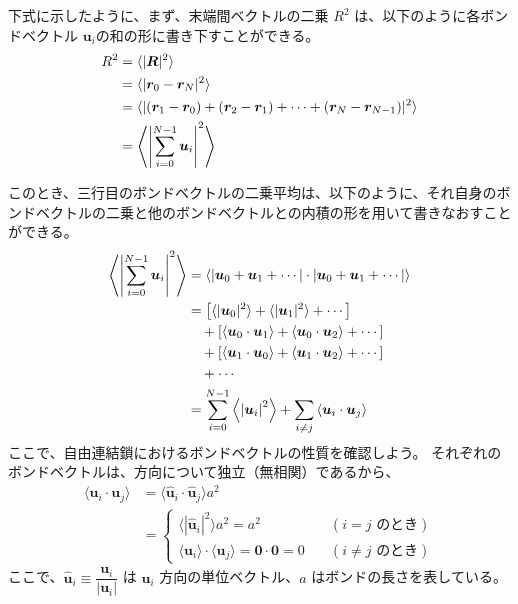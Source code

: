 \documentclass[uplatex,dvipdfmx,a4paper,11pt, titlepage]{jsarticle}
\begin{document}
\begin{itemize}
\begin{enumerate}
	下式に示したように、まず、末端間ベクトルの二乗 $R^2$ は、以下のように各ボンドベクトル ${\bm u_i}$の和の形に書き下すことができる。
	\begin{align*}
	R^2
	&= \langle |\bm{R}|^2 \rangle \notag \\
	&=\langle |\bm{r}_0 - \bm{r}_N|^2 \rangle \notag \\
	&=\langle |(\bm{r}_1 - \bm{r}_0) + (\bm{r}_2 - \bm{r}_1) + \cdots + (\bm{r}_N - \bm{r}_{N-1})|^2 \rangle \notag \\
	&=\left\langle \left|\sum_{i=0}^{N-1}\bm{u}_i \right|^2 \right\rangle
	\end{align*}

	このとき、三行目のボンドベクトルの二乗平均は、以下のように、それ自身のボンドベクトルの二乗と他のボンドベクトルとの内積の形を用いて書きなおすことができる。
	\begin{align*}
	\left\langle \left|\sum_{i=0}^{N-1}\bm{u}_i \right|^2 \right\rangle
		&= \left\langle \left|\bm{u}_0 + \bm{u}_1 + \cdots \right| \cdot \left|\bm{u}_0 + \bm{u}_1 + \cdots \right| \right\rangle \notag \\
		&= \left[ \langle |\bm{u}_0|^2 \rangle + \langle|\bm{u}_1 |^2\rangle + \cdots \right] \notag \\
		&\quad +\left[ \langle \bm{u}_0 \cdot\bm{u}_1 \rangle + \langle \bm{u}_0 \cdot\bm{u}_2 \rangle + \cdots \right] \notag \\
		&\quad +\left[ \langle \bm{u}_1 \cdot\bm{u}_0 \rangle + \langle \bm{u}_1 \cdot\bm{u}_2 \rangle + \cdots \right] \notag \\
		&\quad + \cdots \notag \\
		&=\sum_{i=0}^{N-1} \left\langle \left|\bm{u}_i \right|^2 \right\rangle 
		+\sum_{i \neq j} \left\langle \bm{u}_i \cdot \bm{u}_j \right\rangle
	\end{align*}
	ここで、自由連結鎖におけるボンドベクトルの性質を確認しよう。
	それぞれのボンドベクトルは、方向について独立（無相関）であるから、
	\begin{align*}
	\langle \bm{u}_i \cdot \bm{u}_j \rangle 
	&= \langle \bm{\hat{u}}_i \cdot \bm{\hat{u}}_j \rangle a^2 \\
	&=
		\begin{cases}
		\langle |\bm{\hat{u}}_i |^2 \rangle a^2 = a^2	&\quad (\text{$i = j$ のとき}) \\
		\langle \bm{u}_i \rangle \cdot \langle \bm{u}_j \rangle = \bm{0}\cdot\bm{0} = 0	&\quad(\text{$i \neq j$ のとき})
		\end{cases}
	\end{align*}
	ここで、$\bm{\hat{u}}_i \equiv \dfrac{\bm{u}_i}{|\bm{u}_i|}$ は $\bm{u}_i$ 方向の単位ベクトル、$a$ はボンドの長さを表している。


\end{enumerate}
\end{itemize}
\end{document}
